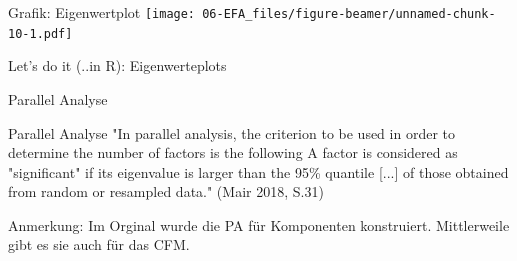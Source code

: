 \documentclass[
  ignorenonframetext,
]{beamer}
\newenvironment{Shaded}{\begin{snugshade}}{\end{snugshade}}
\newcommand{\AttributeTok}[1]{\textcolor[rgb]{0.77,0.63,0.00}{#1}}
\newcommand{\CommentTok}[1]{\textcolor[rgb]{0.56,0.35,0.01}{\textit{#1}}}
\newcommand{\ConstantTok}[1]{\textcolor[rgb]{0.00,0.00,0.00}{#1}}
\newcommand{\DecValTok}[1]{\textcolor[rgb]{0.00,0.00,0.81}{#1}}
\newcommand{\FunctionTok}[1]{\textcolor[rgb]{0.00,0.00,0.00}{#1}}
\newcommand{\NormalTok}[1]{#1}
\newcommand{\OtherTok}[1]{\textcolor[rgb]{0.56,0.35,0.01}{#1}}
\newcommand{\SpecialCharTok}[1]{\textcolor[rgb]{0.00,0.00,0.00}{#1}}
\newcommand{\StringTok}[1]{\textcolor[rgb]{0.31,0.60,0.02}{#1}}
\begin{document}
\begin{frame}{Grafik: Eigenwertplot}
\protect\hypertarget{grafik-eigenwertplot}{}
\texttt{[image: 06-EFA\_files/figure-beamer/unnamed-chunk-10-1.pdf]}
\end{frame}

\begin{frame}[fragile]{Let's do it (..in R): Eigenwerteplots}
\protect\hypertarget{lets-do-it-..in-r-eigenwerteplots}{}
\begin{Shaded}
\end{Shaded}
\end{frame}

\begin{frame}{Parallel Analyse}
\protect\hypertarget{parallel-analyse}{}
\begin{alertblock}{Parallel Analyse}
"In parallel analysis, the criterion to be used in order to determine the number
of factors is the following A factor is considered as "significant" if its
eigenvalue is larger than the 95\% quantile [...] of those obtained from
random or resampled data." (Mair 2018, S.31)
\end{alertblock}

Anmerkung: Im Orginal wurde die PA für Komponenten konstruiert.
Mittlerweile gibt es sie auch für das CFM.
\end{frame}
\end{document}
